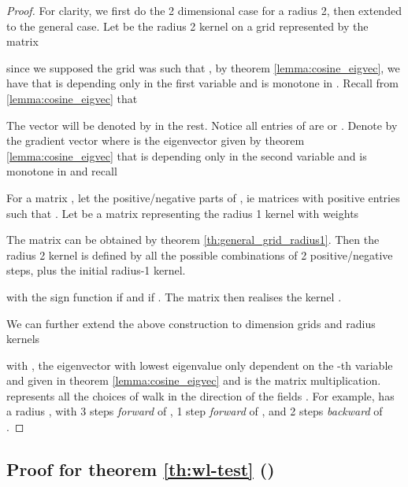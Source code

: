 \documentclass{article} \usepackage{arxiv,times}
\begin{document}
\begin{proof}
For clarity, we first do the 2 dimensional case for a radius 2, then extended to the general case. Let  be the radius 2 kernel on a grid represented by the matrix

since we supposed the  grid was such that , by theorem \ref{lemma:cosine_eigvec}, we have that  is depending only in the first variable  and is monotone in . Recall from \ref{lemma:cosine_eigvec} that 

The vector  will be denoted by  in the rest. Notice all entries of  are  or . Denote by  the gradient vector  where  is the eigenvector given by theorem \ref{lemma:cosine_eigvec} that is depending only in the second variable  and is monotone in  and recall

For a matrix , let  the positive/negative parts of , ie matrices with positive entries such that .
Let  be a matrix representing the radius 1 kernel with weights
 

The matrix  can be obtained by theorem \ref{th:general_grid_radius1}. Then the radius 2 kernel  is defined by all the possible combinations of 2 positive/negative steps, plus the initial radius-1 kernel.

with  the sign function  if  and  if . The matrix  then realises the kernel .

We can further extend the above construction to  dimension grids and radius  kernels 


with  , the eigenvector with lowest eigenvalue only dependent on the -th variable and given in theorem \ref{lemma:cosine_eigvec} and  is the matrix multiplication.  represents all the choices of walk  in the direction of the fields . For example,  has a radius , with 3 steps \textit{forward} of , 1 step \textit{forward} of , and 2 steps \textit{backward} of .

\end{proof}


\subsection{Proof for theorem \ref{th:wl-test} ()}
\label{app:proof:wl-test}
\end{document}
